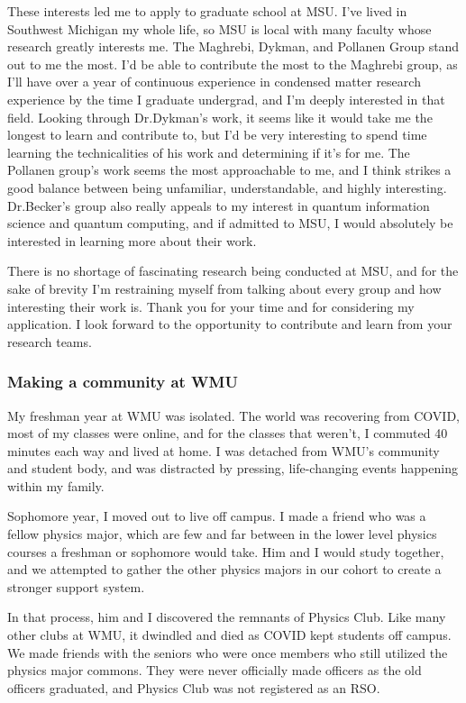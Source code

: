 \documentclass[11pt]{article}
\begin{document}
These interests led me to apply to graduate school at MSU. I've lived in Southwest Michigan my whole life, so MSU is local with many faculty whose research greatly interests me. The Maghrebi, Dykman, and Pollanen Group stand out to me the most. I'd be able to contribute the most to the Maghrebi group, as I'll have over a year of continuous experience in condensed matter research experience by the time I graduate undergrad, and I'm deeply interested in that field. Looking through Dr.\@ Dykman's work, it seems like it would take me the longest to learn and contribute to, but I'd be very interesting to spend time learning the technicalities of his work and determining if it's for me. The Pollanen group's work seems the most approachable to me, and I think strikes a good balance between being unfamiliar, understandable, and highly interesting. Dr.\@ Becker's group also really appeals to my interest in quantum information science and quantum computing, and if admitted to MSU, I would absolutely be interested in learning more about their work.

There is no shortage of fascinating research being conducted at MSU, and for the sake of brevity I'm restraining myself from talking about every group and how interesting their work is. Thank you for your time and for considering my application. I look forward to the opportunity to contribute and learn from your research teams.

\subsubsection*{Making a community at WMU}
My freshman year at WMU was isolated. The world was recovering from COVID, most of my classes were online, and for the classes that weren't, I commuted 40 minutes each way and lived at home. I was detached from WMU's community and student body, and was distracted by pressing, life-changing events happening within my family.

Sophomore year, I moved out to live off campus. I made a friend who was a fellow physics major, which are few and far between in the lower level physics courses a freshman or sophomore would take. Him and I would study together, and we attempted to gather the other physics majors in our cohort to create a stronger support system.

In that process, him and I discovered the remnants of Physics Club. Like many other clubs at WMU, it dwindled and died as COVID kept students off campus. We made friends with the seniors who were once members who still utilized the physics major commons. They were never officially made officers as the old officers graduated, and Physics Club was not registered as an RSO.
\end{document}
